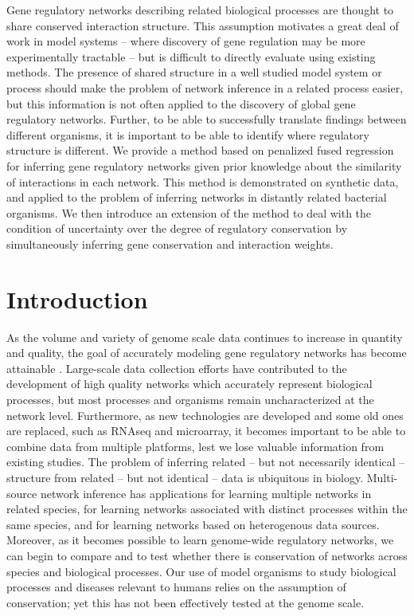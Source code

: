 \documentclass[11pt]{article}
\begin{document}
Gene regulatory networks describing related biological processes are thought to share conserved interaction structure. This assumption motivates a great deal of work in model systems – where discovery of gene regulation may be more experimentally tractable – but is difficult to directly evaluate using existing methods. The presence of shared structure in a well studied model system or process should make the problem of network inference in a related process easier, but this information is not often applied to the discovery of global gene regulatory networks. Further, to be able to successfully translate findings between different organisms, it is important to be able to identify where regulatory structure is different. We provide a method based on penalized fused regression for inferring gene regulatory networks given prior knowledge about the similarity of interactions in each network. This method is demonstrated on synthetic data, and applied to the problem of inferring networks in distantly related bacterial organisms. We then introduce an extension of the method to deal with the condition of uncertainty over the degree of regulatory conservation by simultaneously inferring gene conservation and interaction weights.


\section{Introduction}
As the volume and variety of genome scale data continues to increase in quantity and quality, the goal of accurately modeling gene regulatory networks has become attainable \cite{bonneau_predictive_2007, ciofani_validated_2012, carro_transcriptional_2010}. 
Large-scale data collection efforts have contributed to the development of high quality networks which accurately represent biological processes, but most processes and organisms remain uncharacterized at the network level. 
Furthermore, as new technologies are developed and some old ones are replaced, such as RNAseq and microarray, it becomes important to be able to combine data from multiple platforms, lest we lose valuable information from existing studies. The problem of inferring related -- but not necessarily identical -- structure from related -- but not identical -- data is ubiquitous in biology. 
Multi-source network inference has applications for learning multiple networks in related species, for learning networks associated with distinct processes within the same species, and for learning networks based on heterogenous data sources. 
Moreover, as it becomes possible to learn genome-wide regulatory networks, we can begin to compare and to test whether there is conservation of networks across species and biological processes. 
Our use of model organisms to study biological processes and diseases relevant to humans relies on the assumption of conservation; yet this has not been effectively tested at the genome scale. 
\end{document}
